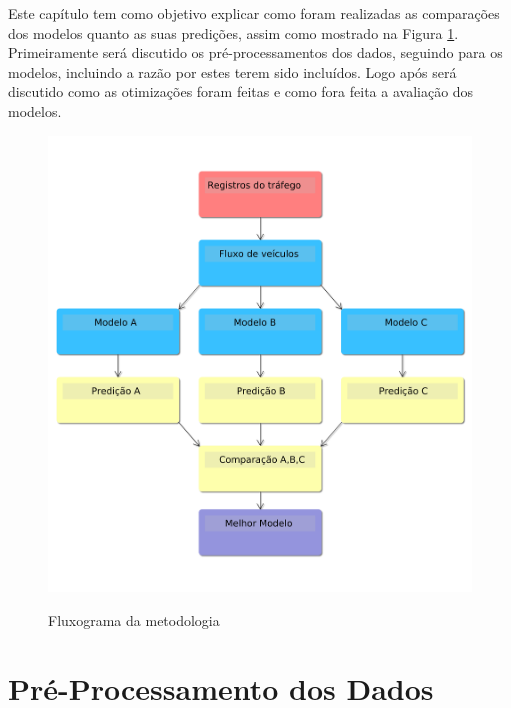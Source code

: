


Este capítulo tem como objetivo explicar como foram realizadas as comparações dos modelos quanto as suas predições, assim como mostrado na Figura \ref{figure:metodologia}. Primeiramente será discutido os pré-processamentos dos dados, seguindo para os modelos, incluindo a razão por estes terem sido incluídos. Logo após será discutido como as otimizações foram feitas e como fora feita a avaliação dos modelos.


\begin{figure}
    \centering
    \includegraphics[scale=0.4]{monography/img/tccFlux.png}
    \label{figure:metodologia}
    \caption[Fluxograma da metodologia]{Fluxograma da metodologia}
\end{figure}

\section{Pré-Processamento dos Dados}

